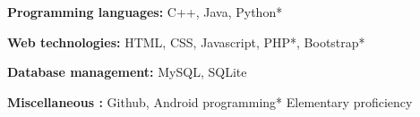\vspace{-7.2mm}


\begin{cventries}

  \cventry
    {} %
    {} %
    {} %
    {} %
    {\vspace{-8mm}
      \begin{cvitems} %
        \item {\bodyfont\textbf{\color{darkgray}Programming languages:} \small C++, Java, Python*}
        \item {\bodyfont\textbf{\color{darkgray}Web technologies:} \small  HTML, CSS, Javascript, PHP*, Bootstrap*}
        \item {\bodyfont\textbf{\color{darkgray}Database management:} \small MySQL, SQLite}
        \item {\bodyfont\textbf{\color{darkgray}Miscellaneous :} \small Github, Android programming*}
        \newline\small * Elementary proficiency
      \end{cvitems}
    }

\end{cventries}